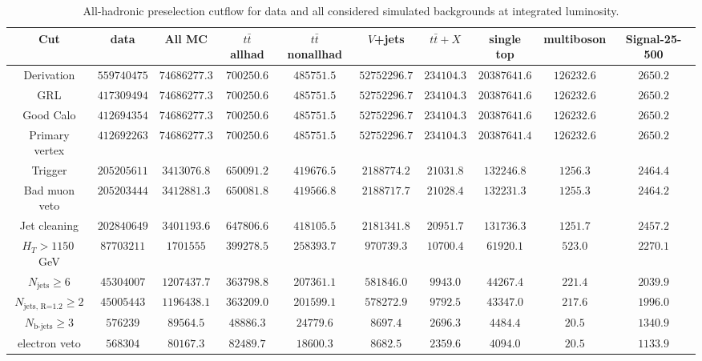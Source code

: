 \begin{table}
    \caption{All-hadronic preselection cutflow for data and all considered simulated backgrounds at \lumi integrated luminosity.}
    \label{tab:allhad_cuflow}
    \centering
    \setlength{\tabcolsep}{3pt}
    \begin{tabular}{c||c||c||c|c|c|c|c|c||c}
      \hline
      \hline
      Cut & data & All MC & $t\bar{t}$ allhad & $t\bar{t}$ nonallhad & $V$+jets & $t\bar{t}+X$ & single top & multiboson & Signal-25-500 \\
      \hline
      Derivation & $559740475$ & $74686277.3$ & $700250.6$ & $485751.5$ & $52752296.7$ & $234104.3$ & $20387641.6$ & $126232.6$ & $2650.2$ \\
      GRL & $417309494$ & $74686277.3$ & $700250.6$ & $485751.5$ & $52752296.7$ & $234104.3$ & $20387641.6$ & $126232.6$ & $2650.2$ \\
      Good Calo & $412694354$ & $74686277.3$ & $700250.6$ & $485751.5$ & $52752296.7$ & $234104.3$ & $20387641.6$ & $126232.6$ & $2650.2$ \\
      Primary vertex & $412692263$ & $74686277.3$ & $700250.6$ & $485751.5$ & $52752296.7$ & $234104.3$ & $20387641.4$ & $126232.6$ & $2650.2$ \\
      Trigger & $205205611$ & $3413076.8$ & $650091.2$ & $419676.5$ & $2188774.2$ & $21031.8$ & $132246.8$ & $1256.3$ & $2464.4$ \\
      Bad muon veto & $205203444$ & $3412881.3$ & $650081.8$ & $419566.8$ & $2188717.7$ & $21028.4$ & $132231.3$ & $1255.3$ & $2464.2$ \\
      Jet cleaning & $202840649$ & $3401193.6$ & $647806.6$ & $418105.5$ & $2181341.8$ & $20951.7$ & $131736.3$ & $1251.7$ & $2457.2$ \\
      $H_{T}>1150~$GeV & $87703211$ & $1701555$ & $399278.5$ & $258393.7$ & $970739.3$ & $10700.4$ & $61920.1$ & $523.0$ & $2270.1$ \\
      $N_{\text{jets}}\geq6$ & $45304007$ & $1207437.7$ & $363798.8$ & $207361.1$ & $581846.0$ & $9943.0$ & $44267.4$ & $221.4$ & $2039.9$ \\
      $N_{\text{jets, R=1.2}}\geq2$ & $45005443$ & $1196438.1$ & $363209.0$ & $201599.1$ & $578272.9$ & $9792.5$ & $43347.0$ & $217.6$ & $1996.0$ \\
      $N_{\text{b-jets}}\geq 3$ & $576239$ & $89564.5$ & $48886.3$ & $24779.6$ & $8697.4$ & $2696.3$ & $4484.4$ & $ 20.5$ & $1340.9$ \\
      electron veto & $568304$ & $80167.3$ & $82489.7$ & $18600.3$ & $8682.5$ & $2359.6$ & $4094.0$ & $ 20.5$ & $1133.9$ \\

\end{tabular}
\end{table}
